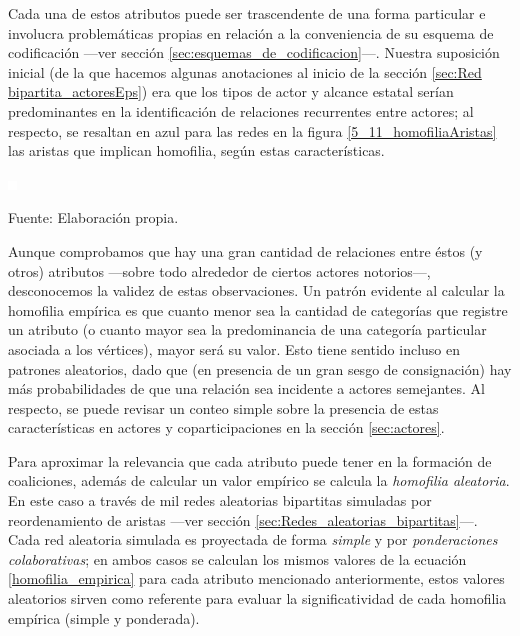 \documentclass[letterpaper, 11pt]{book}
\theoremstyle{definition}
\theoremstyle{remark}
\begin{document}
Cada una de estos atributos puede ser trascendente de una forma particular e involucra problemáticas propias en relación a la conveniencia de su esquema de codificación ---ver sección \ref{sec:esquemas_de_codificacion}---. 
Nuestra suposición inicial (de la que hacemos algunas anotaciones al inicio de la sección \ref{sec:Red bipartita_actoresEps}) era que los tipos de actor y alcance estatal serían predominantes en la identificación de relaciones recurrentes entre actores; al respecto, se resaltan en azul para las redes en la figura \ref{5_11_homofiliaAristas} las aristas que implican homofilia, según estas características. 



\pagebreak
\hspace{-1em}\begin{minipage}{\linewidth}
\centering
{} \label{5_11_homofiliaAristas}

\includegraphics[scale=0.1]{img/null.png}
\vspace{19em}
\par\bigskip
\small Fuente: Elaboración propia.
\end{minipage}\bigskip


Aunque comprobamos que hay una gran cantidad de relaciones entre éstos (y otros) atributos ---sobre todo alrededor de ciertos actores notorios---, desconocemos la validez de estas observaciones. 
Un patrón evidente al calcular la homofilia empírica es que cuanto menor sea la cantidad de categorías que registre un atributo (o cuanto mayor sea la predominancia de una categoría particular asociada a los vértices), mayor será su valor. 
Esto tiene sentido incluso en patrones aleatorios, dado que (en presencia de un gran sesgo de consignación) hay más probabilidades de que una relación sea incidente a actores semejantes. 
Al respecto, se puede revisar un conteo simple sobre la presencia de estas características en actores y coparticipaciones en la sección \ref{sec:actores}. 


Para aproximar la relevancia que cada atributo puede tener en la formación de coaliciones, además de calcular un valor empírico se calcula la \emph{homofilia aleatoria}. 
En este caso a través de mil redes aleatorias bipartitas simuladas por reordenamiento de aristas ---ver sección \ref{sec:Redes_aleatorias_bipartitas}---. 
Cada red aleatoria simulada es proyectada de forma \emph{simple} y por \emph{ponderaciones colaborativas}; en ambos casos se calculan los mismos valores de la ecuación \ref{homofilia_empirica} para cada atributo mencionado anteriormente, estos valores aleatorios sirven como referente para evaluar la significatividad de cada homofilia empírica (simple y ponderada). 
\end{document}
